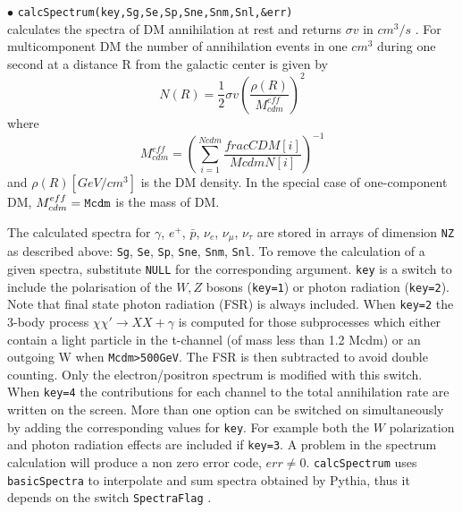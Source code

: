 \documentclass[12pt,a4paper]{article}
\begin{document}
\noindent
$\bullet$ \verb|calcSpectrum(key,Sg,Se,Sp,Sne,Snm,Snl,&err)|\\
calculates  the spectra  of DM annihilation 
at rest and returns $\sigma v$ in $cm^3/s$ . 
For multicomponent DM the number of annihilation events in one $cm^{3}$   during one second  at a distance R from the  galactic center is given by
\begin{equation}
      N(R)=\frac{1}{2} \sigma v \left( \frac{\rho(R)}{M_{cdm}^{eff}}\right)^2
\end{equation}
where 
\begin{equation} 
  \label{McdmEff}
  M_{cdm}^{eff}= \left( \sum_{i=1}^{Ncdm} \frac{fracCDM[i]}{McdmN[i]}\right)^{-1}
\end{equation}  
and $\rho(R) [GeV/cm^3]$ is the DM density. In the special  case of one-component DM,  $M_{cdm}^{eff}={\tt Mcdm}$  is the mass  of DM. 


The calculated spectra
for $\gamma$, $e^+$, $\bar{p}$, $\nu_e$, $\nu_{\mu}$, $\nu_{\tau}$ 
are stored in arrays of dimension \verb|NZ| as described above: \verb|Sg|, \verb|Se|, \verb|Sp|, \verb|Sne|, \verb|Snm|, \verb|Snl|. 
 To remove the calculation of a given spectra, substitute  
\verb|NULL| for the corresponding argument. 
\verb|key| is a switch to include the polarisation of the  $W,Z$ bosons (\verb|key=1|) or
 photon radiation (\verb|key=2|).  
 Note that final state photon radiation (FSR) is always included.
When \verb|key=2| the 3-body  process $\chi\chi'\rightarrow XX +\gamma$ is computed for those subprocesses which either contain a light particle in the t-channel (of mass less than 1.2 Mcdm) or an outgoing W when \verb|Mcdm>500GeV|. The FSR is then subtracted to avoid double counting.
Only the electron/positron spectrum is modified with this switch.
When \verb|key=4| the contributions  for each  channel to the total
annihilation rate  are written on the screen. More than one option
can be switched on simultaneously by adding the corresponding values for \verb|key|. 
For example both the $W$ polarization and photon radiation effects  are included if
\verb|key=3|.
A problem in the spectrum calculation will produce a non zero error code, $err\neq
0$. {\tt calcSpectrum} uses {\tt basicSpectra} to  interpolate and sum spectra obtained by Pythia, thus it depends on the switch  {\tt SpectraFlag} .\\
\end{document}
